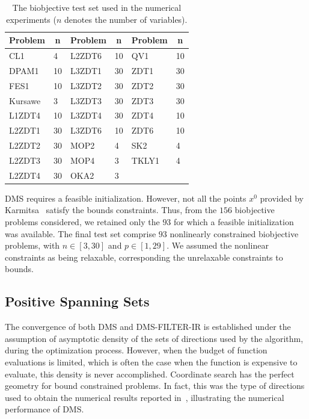 \documentclass[12pt]{article}
\begin{document}
\begin{table}[h!]
\centering
\begin{tabular}{@{}llllll@{}}
\toprule \multicolumn{1}{c}{\textbf{Problem}} &
\multicolumn{1}{c}{\textbf{n}} &
\multicolumn{1}{c}{\textbf{Problem}} &
\multicolumn{1}{c}{\textbf{n}} &
\multicolumn{1}{c}{\textbf{Problem}} &
\multicolumn{1}{c}{\textbf{n}} \\ \midrule
CL1 & 4 & L2ZDT6 & 10 & QV1 & 10 \\
DPAM1& 10 & L3ZDT1 & 30 & ZDT1 & 30\\
FES1 & 10 & L3ZDT2 & 30 & ZDT2 & 30\\
Kursawe& 3 & L3ZDT3 & 30 & ZDT3& 30\\
L1ZDT4& 10& L3ZDT4& 30 & ZDT4  & 10\\
L2ZDT1& 30& L3ZDT6 & 10 & ZDT6& 10\\
L2ZDT2 & 30 & MOP2 & 4 & SK2 & 4 \\
L2ZDT3 & 30 & MOP4 & 3 & TKLY1 & 4 \\
L2ZDT4 & 30 & OKA2 & 3 & &\\
\bottomrule
\end{tabular}
\caption{The biobjective test set used in the numerical
experiments ($n$ denotes the number of variables).}
\label{biobjective_problems}
\end{table}

DMS requires a feasible initialization. However, not all the
points $x^0$ provided by Karmitsa~\cite{karmitsa} satisfy the
bounds constraints. Thus, from the $156$ biobjective problems
considered, we retained only the $93$ for which a feasible
initialization was available. The final test set comprise $93$
nonlinearly constrained biobjective problems, with $n\in [3,30]$
and $p\in [1,29]$. We assumed the nonlinear constraints as being
relaxable, corresponding the unrelaxable constraints to bounds.

\subsection{Positive Spanning Sets}

The convergence of both DMS and DMS-FILTER-IR is established under
the assumption of asymptotic density of the sets of directions
used by the algorithm, during the optimization process. However,
when the budget of function evaluations is limited, which is often
the case when the function is expensive to evaluate, this density
is never accomplished. Coordinate search has the perfect geometry
for bound constrained problems. In fact, this was the type of
directions used to obtain the numerical results reported
in~\cite{custodio2011}, illustrating the numerical performance of
DMS.
\end{document}
